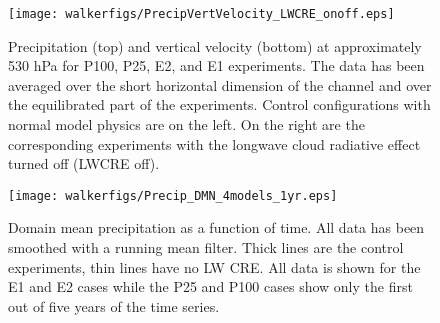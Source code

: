\documentclass[draft]{agujournal2019}
\begin{document}



\begin{figure}
  \centering
      \texttt{[image: walkerfigs/PrecipVertVelocity\_LWCRE\_onoff.eps]}
  \caption{Precipitation (top) and vertical velocity (bottom) at approximately 530 hPa for P100, P25, E2, and E1 experiments.  
  The data has been averaged over the short horizontal dimension of the channel and over the 
  equilibrated part of the experiments.  Control configurations with normal model physics are on the 
  left.  On the right are the corresponding experiments with the longwave cloud radiative effect turned
  off (LWCRE off).}
  \label{fig:precip_vertvel}
\end{figure}
%
%
%

\begin{figure}
  \centering
      \texttt{[image: walkerfigs/Precip\_DMN\_4models\_1yr.eps]}
  \caption{Domain mean precipitation as a function of time.  All data has been smoothed with a running mean filter.  
  Thick lines are the control experiments, thin lines have no LW CRE.  All data is shown for the E1 and E2 cases
  while the P25 and P100 cases show only the first out of five years of the time series.}
    \label{fig:precip_dom_mn}
\end{figure}
\end{document}
